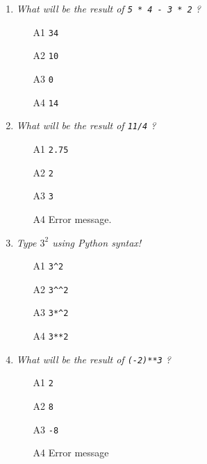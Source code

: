 \begin{enumerate}

\item {\em What will be the result of {\tt 5 * 4 - 3 * 2} ?}\\

\begin{enumerate}
\item[A1] {\tt 34}
\item[A2] {\tt 10}
\item[A3] {\tt 0}
\item[A4] {\tt 14}
\end{enumerate}

\vspace{6mm}

\item {\em What will be the result of {\tt 11/4} ?}\\

\begin{enumerate}
\item[A1] {\tt 2.75}
\item[A2] {\tt 2}
\item[A3] {\tt 3}
\item[A4] Error message.
\end{enumerate}

\vspace{6mm}

\item {\em Type $3^2$ using Python syntax!}\\

\begin{enumerate}
\item[A1] {\tt 3\^{}2}
\item[A2] {\tt 3\^{}\^{}2}
\item[A3] {\tt 3*\^{}2}
\item[A4] {\tt 3**2}
\end{enumerate}

\vspace{6mm}

\item {\em What will be the result of {\tt (-2)**3} ?}\\

\begin{enumerate}
\item[A1] {\tt 2}
\item[A2] {\tt 8}
\item[A3] {\tt -8}
\item[A4] Error message
\end{enumerate}


\end{enumerate}
